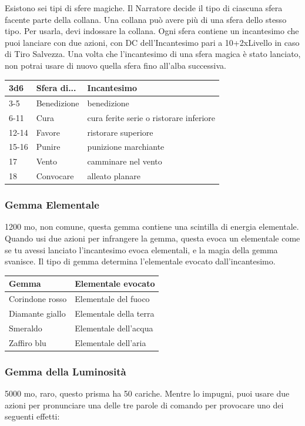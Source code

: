 \begin{multicols}{2}
Esistono sei tipi di sfere magiche. Il Narratore decide il tipo di ciascuna sfera facente parte della collana. Una collana può avere più di una sfera dello stesso tipo. Per usarla, devi indossare la collana. Ogni sfera contiene un incantesimo che puoi lanciare con due azioni, con DC dell'Incantesimo pari a 10+2xLivello in caso di Tiro Salvezza. Una volta che l'incantesimo di una sfera magica è stato lanciato, non potrai usare di nuovo quella sfera fino all'alba successiva.

\medskip

\begin{tabularx}{0.45\textwidth}{llX}
\textbf{3d6} &\textbf{Sfera di...} &\textbf{Incantesimo}\\
\hline
3-5 &Benedizione &benedizione\\
6-11& Cura &cura ferite serie o ristorare inferiore\\
12-14 &Favore& ristorare superiore\\
15-16& Punire &punizione marchiante\\
17 &Vento& camminare nel vento\\
18 &Convocare &alleato planare\\
\end{tabularx}


\subsubsection*{Gemma Elementale}
1200 mo, non comune, questa gemma contiene una scintilla di energia elementale. Quando usi due azioni per infrangere la gemma, questa evoca un elementale come se tu avessi lanciato l'incantesimo evoca elementali, e la magia della gemma svanisce. Il tipo di gemma determina l'elementale evocato dall'incantesimo.

\medskip

\begin{tabular}{ll}
\textbf{Gemma} &\textbf{Elementale evocato}\\
\hline
Corindone rosso& Elementale del fuoco\\
Diamante giallo& Elementale della terra\\
Smeraldo &Elementale dell'acqua\\
Zaffiro blu&Elementale dell'aria\\
\end{tabular}

\medskip

\subsubsection*{Gemma della Luminosità}
5000 mo, raro, questo prisma ha 50 cariche. Mentre lo impugni, puoi usare due azioni per pronunciare una delle tre parole di comando per provocare uno dei seguenti effetti:


\end{multicols}

